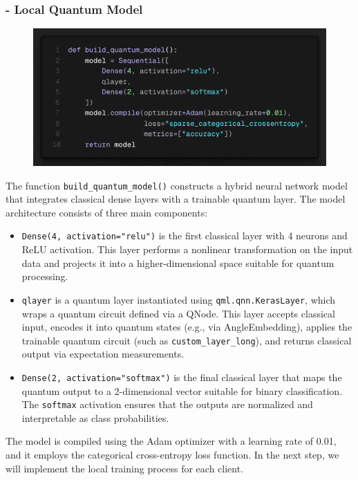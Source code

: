 \documentclass[10pt]{article}
\begin{document}
\subsubsection*{- Local Quantum Model}
\begin{figure}[H]
	\centering
	\includegraphics[height = 0.2\textheight]{img/QFL_code/6.png}
\end{figure}
The function \texttt{build\_quantum\_model()} constructs a hybrid neural network model that integrates classical dense layers with a trainable quantum layer.
The model architecture consists of three main components:
\begin{itemize}
	\item \texttt{Dense(4, activation="relu")} is the first classical layer with 4 neurons and ReLU activation. This layer performs a nonlinear transformation on the input data and projects it into a higher-dimensional space suitable for quantum processing.
	\item \texttt{qlayer} is a quantum layer instantiated using \texttt{qml.qnn.KerasLayer}, which wraps a quantum circuit defined via a QNode. This layer accepts classical input, encodes it into quantum states (e.g., via AngleEmbedding), applies the trainable quantum circuit (such as \texttt{custom\_layer\_long}), and returns classical output via expectation measurements.
	\item \texttt{Dense(2, activation="softmax")} is the final classical layer that maps the quantum output to a 2-dimensional vector suitable for binary classification. The \texttt{softmax} activation ensures that the outputs are normalized and interpretable as class probabilities.
\end{itemize}
The model is compiled using the Adam optimizer with a learning rate of 0.01, and it employs the categorical cross-entropy loss function.
In the next step, we will implement the local training process for each client.
\end{document}
